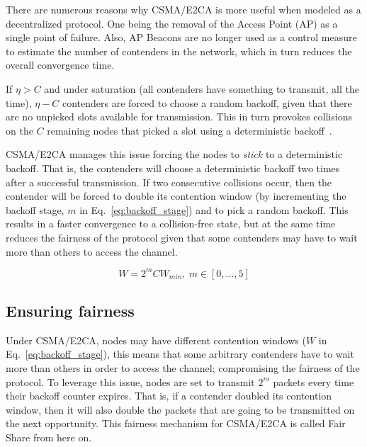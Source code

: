 There are numerous reasons why CSMA/E2CA is more useful when modeled as a decentralized protocol. One being the removal of the Access Point (AP) as a single point of failure. Also, AP Beacons are no longer used as a control measure to estimate the number of contenders in the network, which in turn reduces the overall convergence time.


If $\eta > C$ and under saturation (all contenders have something to transmit, all the time), $\eta - C$ contenders are forced to choose a random backoff, given that there are no unpicked slots available for transmission. This in turn provokes collisions on the $C$ remaining nodes that picked a slot using a deterministic backoff~\cite{CSMA_ECA}. 

CSMA/E2CA manages this issue forcing the nodes to \emph{stick} to a deterministic backoff. That is, the contenders will choose a deterministic backoff two times after a successful transmission. If two consecutive collisions occur, then the contender will be forced to double its contention window (by incrementing the backoff stage, $m$ in Eq.~\ref{eq:backoff_stage}) and to pick a random backoff. This results in a faster convergence to a collision-free state, but at the same time reduces the fairness of the protocol given that some contenders may have to wait more than others to access the channel.

\begin{equation} \label{eq:backoff_stage}
	W = 2^{m}CW_{min},\ m\in[0,...,5]
\end{equation}

\subsection{Ensuring fairness}
Under CSMA/E2CA, nodes may have different contention windows ($W$ in Eq.~\ref{eq:backoff_stage}), this means that some arbitrary contenders have to wait more than others in order to access the channel; compromising the fairness of the protocol. To leverage this issue, nodes are set to transmit $2^{m}$ packets every time their backoff counter expires. That is, if a contender doubled its contention window, then it will also double the packets that are going to be transmitted on the next opportunity. This fairness mechanism for CSMA/E2CA is called Fair Share from here on.

